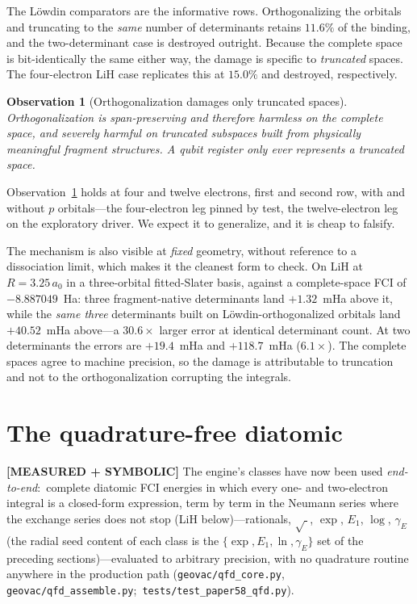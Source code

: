 \documentclass[aps,pra,twocolumn,superscriptaddress,longbibliography]{revtex4-2}
\newtheorem{observation}{Observation}
\begin{document}
The L\"owdin comparators are the informative rows.  Orthogonalizing the
orbitals and truncating to the \emph{same} number of determinants retains
$11.6\%$ of the binding, and the two-determinant case is destroyed
outright.  Because the complete space is bit-identically the same either
way, the damage is specific to \emph{truncated} spaces.  The four-electron
LiH case replicates this at $15.0\%$ and destroyed, respectively.

\begin{observation}[Orthogonalization damages only truncated spaces]
\label{obs:truncation}
Orthogonalization is span-preserving and therefore harmless on the
complete space, and severely harmful on truncated subspaces built from
physically meaningful fragment structures.  A qubit register only ever
represents a truncated space.
\end{observation}

Observation~\ref{obs:truncation} holds at four and twelve electrons,
first and second row, with and without $p$ orbitals---the four-electron
leg pinned by test, the twelve-electron leg on the exploratory driver.  We
expect it to generalize, and it is cheap to falsify.

The mechanism is also visible at \emph{fixed} geometry, without reference
to a dissociation limit, which makes it the cleanest form to check.  On
LiH at $R = 3.25\,a_0$ in a three-orbital fitted-Slater basis, against a
complete-space FCI of $-8.887049$~Ha: three fragment-native determinants
land $+1.32$~mHa above it, while the \emph{same three} determinants built
on L\"owdin-orthogonalized orbitals land $+40.52$~mHa above---a
$30.6\times$ larger error at identical determinant count.  At two
determinants the errors are $+19.4$~mHa and $+118.7$~mHa
($6.1\times$).  The complete spaces agree to machine precision, so the
damage is attributable to truncation and not to the orthogonalization
corrupting the integrals.

\section{The quadrature-free diatomic}
\label{sec:qfd}

\textbf{[MEASURED + SYMBOLIC]} The engine's classes have now been used
\emph{end-to-end}:\ complete diatomic FCI energies in which every one- and
two-electron integral is a closed-form expression, term by term in the Neumann series
where the exchange series does not stop (LiH below)---rationals, $\sqrt{\phantom.}$,
$\exp$, $E_1$, $\log$, $\gamma_E$ (the radial seed content of
each class is the $\{\exp,E_1,\ln,\gamma_E\}$ set of the preceding sections)---evaluated to arbitrary precision,
with no quadrature routine anywhere in the production path
(\texttt{geovac/qfd\_core.py}, \texttt{geovac/qfd\_assemble.py};\
\texttt{tests/test\_paper58\_qfd.py}).
\end{document}
